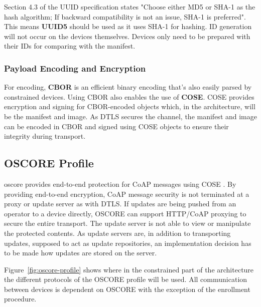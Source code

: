 \documentclass[0-thesis.tex]{subfiles}
\begin{document}
Section 4.3 of the UUID specification states "Choose either MD5 or SHA-1 as the hash
algorithm; If backward compatibility is not an issue, SHA-1 is preferred". This means
\textbf{UUID5} should be used as it uses SHA-1 for hashing. ID generation will not occur
on the devices themselves. Devices only need to be prepared with their IDs for comparing
with the manifest.

\subsubsection{Payload Encoding and Encryption}
\label{sssec:encoding-encryption}
For encoding, \textbf{CBOR} is an efficient binary encoding that's also easily parsed by
constrained devices. Using CBOR also enables the use of \textbf{COSE}. COSE provides
encryption and signing for CBOR-encoded objects which, in the architecture, will be the
manifest and image. As DTLS secures the channel, the manifest and image can be encoded in
CBOR and signed using COSE objects to ensure their integrity during transport. 

\subsection{OSCORE Profile}
\label{ssec:oscore-profile}
\acrfull{oscore} provides end-to-end protection for CoAP messages using COSE
\parencite{oscore}. By providing end-to-end encryption, CoAP message security is not
terminated at a proxy or update server as with DTLS. If updates are being pushed from an
operator to a device directly, OSCORE can support HTTP/CoAP proxying to secure the entire
transport. The update server is not able to view or manipulate the protected contents. As
update servers are, in addition to transporting updates, supposed to act as update
repositories, an implementation decision has to be made how updates are stored on the
server.

Figure~\ref{fig:oscore-profile} shows where in the constrained part of the architecture
the different protocols of the OSCORE profile will be used. All communication between
devices is dependent on OSCORE with the exception of the enrollment procedure.
\end{document}
